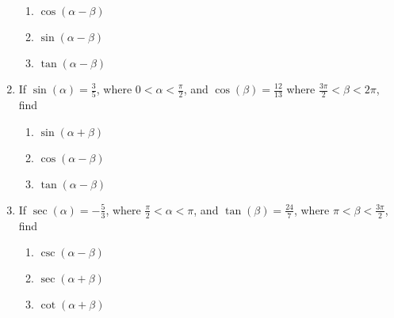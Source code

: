 \begin{enumerate}
\begin{multicols}{3}
\begin{enumerate}
\end{enumerate}

\end{multicols}

\begin{multicols}{3}

\begin{enumerate}

\setcounter{enumii}{\value{HWindent}}

\item  $\cos(\alpha - \beta)$
\item  $\sin(\alpha - \beta)$
\item  $\tan(\alpha - \beta)$

\end{enumerate}

\end{multicols}

\item If $\sin(\alpha) = \frac{3}{5}$, where $0 < \alpha < \frac{\pi}{2}$, and $\cos(\beta) = \frac{12}{13}$ where $\frac{3\pi}{2} < \beta < 2\pi$, find 

\begin{multicols}{3}

\begin{enumerate}

\item $\sin(\alpha + \beta)$
\item $\cos(\alpha - \beta)$
\item $\tan(\alpha - \beta)$

\end{enumerate}

\end{multicols}



\item If $\sec(\alpha) = -\frac{5}{3}$, where $\frac{\pi}{2} < \alpha < \pi$, and $\tan(\beta) = \frac{24}{7}$, where $\pi < \beta < \frac{3\pi}{2}$, find

\begin{multicols}{3}

\begin{enumerate}

\item $\csc(\alpha - \beta)$
\item $\sec(\alpha + \beta)$
\item $\cot(\alpha + \beta)$

\end{enumerate}

\end{multicols}

\setcounter{HW}{\value{enumi}}

\end{enumerate}

